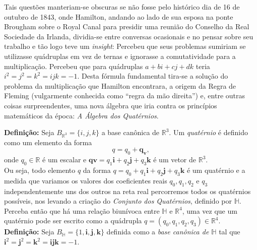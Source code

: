\documentclass[a4paper,12pt]{report}
\theoremstyle{plain}
\theoremstyle{definition}
\begin{document}
Tais questões manteriam-se obscuras se não fosse pelo histórico dia de 16 de outubro de 1843, onde Hamilton, andando ao lado de sua esposa na ponte Brougham sobre o Royal Canal para presidir uma reunião do Conselho da Real Sociedade da Irlanda, dividia-se entre conversas ocasionais e no pensar sobre seu trabalho e tão logo teve um \textit{insight}: Percebeu que seus problemas sumiriam se utilizasse quádruplas em vez de ternas e ignorasse a comutatividade para a multiplicação. Percebeu que para quádruplas $a + bi + cj + dk$ teria $i^2 = j^2 = k^2 = ijk = -1$. Desta fórmula fundamental tira-se a solução do problema da multiplicação que Hamilton encontrara, a origem da Regra de Fleming (vulgarmente conhecida como “regra da mão direita”) e, entre outras coisas surpreendentes, uma nova álgebra que iria contra os princípios matemáticos da época: \textit{A Álgebra dos Quatérnios}.

\textbf{Definição: }Seja $B_{\mathbb{R}^3}=\{i,j,k\}$ a base canônica de $\mathbb{R}^3$. Um \textit{quatérnio} é definido como um elemento da forma 
\begin{equation}
	q=q_0+\mathbf{q_v},
\end{equation} 
onde $q_0 \in \mathbb{R}$ é um escalar e $\mathbf{qv}=q_1\mathbf{i}+q_2\mathbf{j}+q_3\mathbf{k}$ é um vetor de $\mathbb{R}^3$.
\\

Ou seja, todo elemento $q$ da forma $q = q_0 + q_1\textbf{i} + q_2\textbf{j} + q_3\textbf{k}$ é um quatérnio e a medida que variamos os valores dos coeficientes reais $q_0, q_1, q_2$ e $q_3$ independentemente uns dos outros na reta real percorremos todos os quatérnios possíveis, nos levando a criação do \textit{Conjunto dos Quatérnios}, definido por $\mathbb{H}$. Perceba então que há uma relação biunívoca entre $\mathbb{H}$ e $\mathbb{R}^4$, uma vez que um quatérnio pode ser escrito como a quádrupla $q = (q_0, q_1, q_2, q_3) \in \mathbb{R}^4$. \cite{fidalgotese}
\\

\textbf{Definição:} Seja $B_\mathbb{H} = \{1, \mathbf{i}, \mathbf{j}, \mathbf{k}\}$ definida como a \textit{base canônica de $\mathbb{H}$} tal que $\mathbf{i}^2 = \mathbf{j}^2 = \mathbf{k}^2 = \mathbf{ijk} = -1$.
\\
\end{document}
